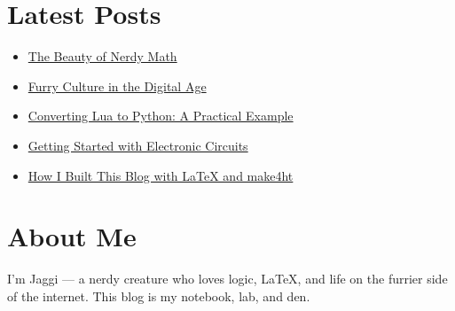 \documentclass{article}
\begin{document}
\section*{Latest Posts}

\begin{itemize}
  \item \href{posts/nerdy-math.html}{The Beauty of Nerdy Math}
  \item \href{posts/furry-culture.html}{Furry Culture in the Digital Age}
  \item \href{posts/lua-to-python.html}{Converting Lua to Python: A Practical Example}
  \item \href{posts/electronic-circuits.html}{Getting Started with Electronic Circuits}
  \item \href{posts/latex-make4ht.html}{How I Built This Blog with LaTeX and make4ht}
\end{itemize}

\section*{About Me}

I'm Jaggi — a nerdy creature who loves logic, LaTeX, and life on the furrier side of the internet. This blog is my notebook, lab, and den.
\end{document}
